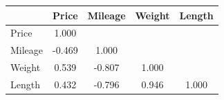 \begin{tabular}{l*{4}{c}}
\doublerule
& Price & Mileage & Weight & Length \\
\midrule
Price           &    1.000&         &         &         \\
Mileage         &   -0.469&    1.000&         &         \\
Weight          &    0.539&   -0.807&    1.000&         \\
Length          &    0.432&   -0.796&    0.946&    1.000\\
\midrule
\end{tabular}
